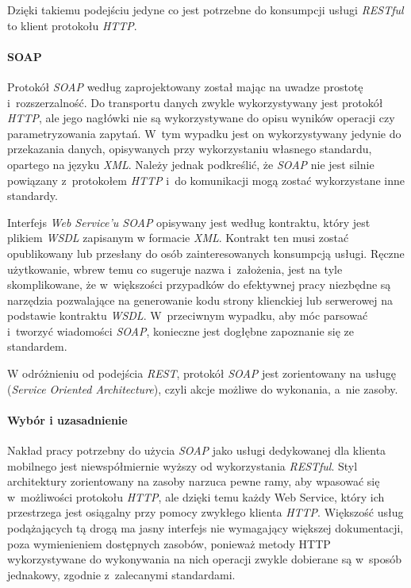 \documentclass[11pt]{aghdpl}
\begin{document}
Dzięki takiemu podejściu jedyne co jest potrzebne do konsumpcji usługi \emph{RESTful} to klient protokołu \emph{HTTP}.

\paragraph{SOAP}

Protokół \emph{SOAP} według \cite{W3Soap} zaprojektowany został mając na uwadze prostotę i~rozszerzalność. Do transportu danych zwykle wykorzystywany jest protokół \emph{HTTP}, ale jego nagłówki nie są wykorzystywane do opisu wyników operacji czy parametryzowania zapytań. W~tym wypadku jest on wykorzystywany jedynie do przekazania danych, opisywanych przy wykorzystaniu własnego standardu, opartego na języku \emph{XML}. Należy jednak podkreślić, że \emph{SOAP} nie jest silnie powiązany z~protokołem \emph{HTTP} i~do komunikacji mogą zostać wykorzystane inne standardy.

Interfejs \emph{Web Service'u SOAP} opisywany jest według kontraktu, który jest plikiem \emph{WSDL} zapisanym w formacie \emph{XML}. Kontrakt ten musi zostać opublikowany lub przesłany do osób zainteresowanych konsumpcją usługi. Ręczne użytkowanie, wbrew temu co sugeruje nazwa i~założenia, jest na tyle skomplikowane, że w~większości przypadków do efektywnej pracy niezbędne są narzędzia pozwalające na generowanie kodu strony klienckiej lub serwerowej na podstawie kontraktu \emph{WSDL}. W~przeciwnym wypadku, aby móc parsować i~tworzyć wiadomości \emph{SOAP}, konieczne jest dogłębne zapoznanie się ze standardem.

W odróżnieniu od podejścia \emph{REST}, protokół \emph{SOAP} jest zorientowany na usługę (\emph{Service Oriented Architecture}), czyli akcje możliwe do wykonania, a~nie zasoby.

\paragraph{Wybór i uzasadnienie}

Nakład pracy potrzebny do użycia \emph{SOAP} jako usługi dedykowanej dla klienta mobilnego jest niewspółmiernie wyższy od wykorzystania \emph{RESTful}. Styl architektury zorientowany na zasoby narzuca pewne ramy, aby wpasować się w~możliwości protokołu \emph{HTTP}, ale dzięki temu każdy Web Service, który ich przestrzega jest osiągalny przy pomocy zwykłego klienta \emph{HTTP}. Większość usług podążających tą drogą ma jasny interfejs nie wymagający większej dokumentacji, poza wymienieniem dostępnych zasobów, ponieważ metody HTTP wykorzystywane do wykonywania na nich operacji zwykle dobierane są w~sposób jednakowy, zgodnie z~zalecanymi standardami.
\end{document}

